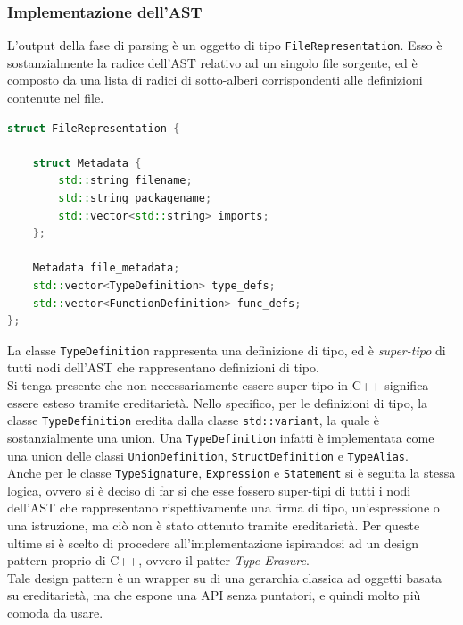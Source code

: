 \subsubsection{Implementazione dell'AST}
L'output della fase di parsing è un oggetto di tipo \texttt{FileRepresentation}. Esso 
è sostanzialmente la radice dell'AST relativo ad un singolo file sorgente, ed è 
composto da una lista di radici di sotto-alberi corrispondenti alle definizioni contenute 
nel file. \\

\vspace{0.5cm}
\begin{lstlisting}[language=C++, frame=single]
struct FileRepresentation {

    struct Metadata {
        std::string filename;
        std::string packagename;
        std::vector<std::string> imports;
    };

    Metadata file_metadata;
    std::vector<TypeDefinition> type_defs;
    std::vector<FunctionDefinition> func_defs;
};
\end{lstlisting}
\vspace{0.5cm}

La classe \texttt{TypeDefinition} rappresenta una definizione di tipo, ed è \textit{super-tipo}
di tutti nodi dell'AST che rappresentano definizioni di tipo. \\

Si tenga presente che non necessariamente essere super tipo in C++ significa essere esteso 
tramite ereditarietà. Nello specifico, per le definizioni di tipo, la classe 
\texttt{TypeDefinition} eredita dalla classe \texttt{std::variant}, la quale è 
sostanzialmente una union. Una \texttt{TypeDefinition} infatti è implementata 
come una union delle classi \texttt{UnionDefinition}, 
\texttt{StructDefinition} e \texttt{TypeAlias}. \\ 

Anche per le classe \texttt{TypeSignature}, \texttt{Expression} e \texttt{Statement}
si è seguita la stessa logica, ovvero si è deciso di far si che esse fossero super-tipi 
di tutti i nodi dell'AST che rappresentano rispettivamente una firma di tipo, un'espressione
o una istruzione, ma ciò non è stato ottenuto tramite ereditarietà. Per queste ultime si è 
scelto di procedere all'implementazione ispirandosi ad un design pattern proprio di 
C++, ovvero il patter \textit{Type-Erasure}. \\

Tale design pattern è un wrapper su di una gerarchia classica ad oggetti basata su ereditarietà,
ma che espone una API senza puntatori, e quindi molto più comoda da usare. \\

